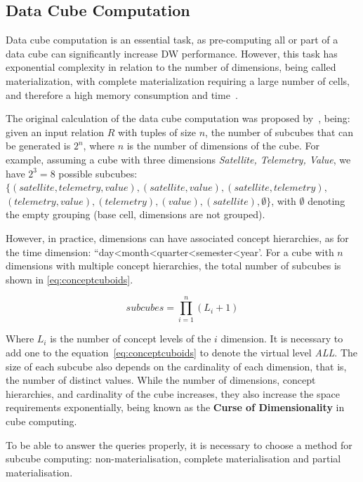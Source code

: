 \subsection{Data Cube Computation}\label{ch:fun:cube:comp}

Data cube computation is an essential task, as pre-computing all or part of a data cube can significantly increase DW performance.
However, this task has exponential complexity in relation to the number of dimensions, being called materialization, with complete materialization requiring a large number of cells, and therefore a high memory consumption and time~\cite{hanDataMiningConcepts2011}.

The original calculation of the data cube computation was proposed by~\cite{grayDataCubeRelational1996}, being: given an input relation $R$ with tuples of size $n$, the number of subcubes that can be generated is $2^n$, where $n$ is the number of dimensions of the cube.
For example, assuming a cube with three dimensions \textit{Satellite, Telemetry, Value}, we have $2^3 = 8$ possible subcubes: $\{(satellite, telemetry, value), (satellite, value), (satellite, telemetry),$ $(telemetry, value), (telemetry), (value), (satellite), \emptyset \}$, with $\emptyset$ denoting the empty grouping (base cell, dimensions are not grouped).

However, in practice, dimensions can have associated concept hierarchies, as for the time dimension: ``day<month<quarter<semester<year'.
For a cube with $n$ dimensions with multiple concept hierarchies, the total number of subcubes is shown in \autoref{eq:conceptcuboids}.

\begin{equation}
  subcubes = \prod_{i=1}^n (L_i + 1)
\label{eq:conceptcuboids}
\end{equation}

Where $L_i$ is the number of concept levels of the $i$ dimension.
It is necessary to add one to the equation~\ref{eq:conceptcuboids} to denote the virtual level \textit{ALL}.
The size of each subcube also depends on the cardinality of each dimension, that is, the number of distinct values.
While the number of dimensions, concept hierarchies, and cardinality of the cube increases, they also increase the space requirements exponentially, being known as the \textbf{Curse of Dimensionality} in cube computing.

To be able to answer the queries properly, it is necessary to choose a method for subcube computing: non-materialisation, complete materialisation and partial materialisation.

